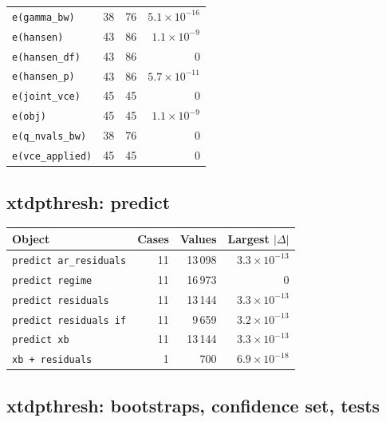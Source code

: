 \documentclass[10.5pt,a4paper]{article}
\begin{document}
\begin{longtable}{@{}p{8.2cm}rrr@{}}
\texttt{e(gamma\_\allowbreak{}bw)} & 38 & 76 & $5.1\times10^{-16}$ \\
\texttt{e(hansen)} & 43 & 86 & $1.1\times10^{-9}$ \\
\texttt{e(hansen\_\allowbreak{}df)} & 43 & 86 & 0 \\
\texttt{e(hansen\_\allowbreak{}p)} & 43 & 86 & $5.7\times10^{-11}$ \\
\texttt{e(joint\_\allowbreak{}vce)} & 45 & 45 & 0 \\
\texttt{e(obj)} & 45 & 45 & $1.1\times10^{-9}$ \\
\texttt{e(q\_\allowbreak{}nvals\_\allowbreak{}bw)} & 38 & 76 & 0 \\
\texttt{e(vce\_\allowbreak{}applied)} & 45 & 45 & 0 \\
\bottomrule
\end{longtable}

\subsection*{xtdpthresh: predict}

\begin{longtable}{@{}p{8.2cm}rrr@{}}
\toprule
Object & Cases & Values & Largest $|\Delta|$ \\
\midrule
\endhead
\texttt{predict ar\_\allowbreak{}residuals} & 11 & 13\,098 & $3.3\times10^{-13}$ \\
\texttt{predict regime} & 11 & 16\,973 & 0 \\
\texttt{predict residuals} & 11 & 13\,144 & $3.3\times10^{-13}$ \\
\texttt{predict residuals if} & 11 & 9\,659 & $3.2\times10^{-13}$ \\
\texttt{predict xb} & 11 & 13\,144 & $3.3\times10^{-13}$ \\
\texttt{xb + residuals} & 1 & 700 & $6.9\times10^{-18}$ \\
\bottomrule
\end{longtable}

\subsection*{xtdpthresh: bootstraps, confidence set, tests}
\end{document}
